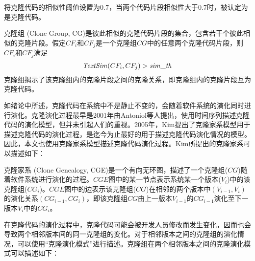 将克隆代码的相似性阈值设置为0.7，当两个代码片段相似性大于0.7时，被认定为是克隆代码。

\begin{definition}[克隆组]
\label {def-clonegroup}
克隆组 (Clone Group, CG)是彼此相似的克隆代码片段的集合，包含若干个彼此相似的克隆片段。假定$CF_i$和$CF_j$是一个克隆组$CG$中的任意两个克隆代码片段，则$CF_i$和$CF_j$满足
  \[
  \begin{array}[t]{c}
    \mathit{TextSim}(CF_i, CF_j) > \mathit{sim\_th} \\
  \end{array}
  \]
克隆组揭示了该克隆组内的克隆片段之间的克隆关系，即克隆组内的克隆片段互为克隆代码。
\end {definition}

如绪论中所述，克隆代码在系统中不是静止不变的，会随着软件系统的演化同时进行演化。克隆演化过程最早是2001年由Antoniol等人提出，使用时间序列描述克隆代码的演化模型\cite{antoniol2001modeling}，但并未引起人们的重视。2005年，Kim提出了克隆家系模型用于描述克隆代码的演化过程，是迄今为止最好的用于描述克隆代码演化情况的模型\cite{kim2005empirical}。因此，本文也使用克隆家系模型描述克隆代码演化过程。Kim所提出的克隆家系可以描述如下：

\begin{definition}[克隆家系]
\label{def-clonegenealogy}
克隆家系 (Clone Genealogy, CGE)是一个有向无环图，描述了一个克隆组($CG$)随着软件系统进行演化的过程。$CGE$图中的某一节点表示系统某一个版本($V_i$)中的该克隆组($CG_i$)。$CGE$图中的边表示该克隆组($CG$)在相邻的两个版本中$(V_{i-1},V_i )$的演化关系$(CG_{i-1},CG_{i})$，即该克隆组$CG$由上一版本$V_{i-1}$的$CG_{i-1}$演化至下一版本$V_{i}$中的$CG_{i}$。
\end{definition} 

在克隆代码的演化过程中，克隆代码可能会被开发人员修改而发生变化，因而也会导致两个相邻版本间的同一克隆组的变化。对于相邻版本之间的克隆组的演化情况，可以使用“克隆演化模式”进行描述。克隆组在两个相邻版本之间的克隆演化模式可以描述如下：

